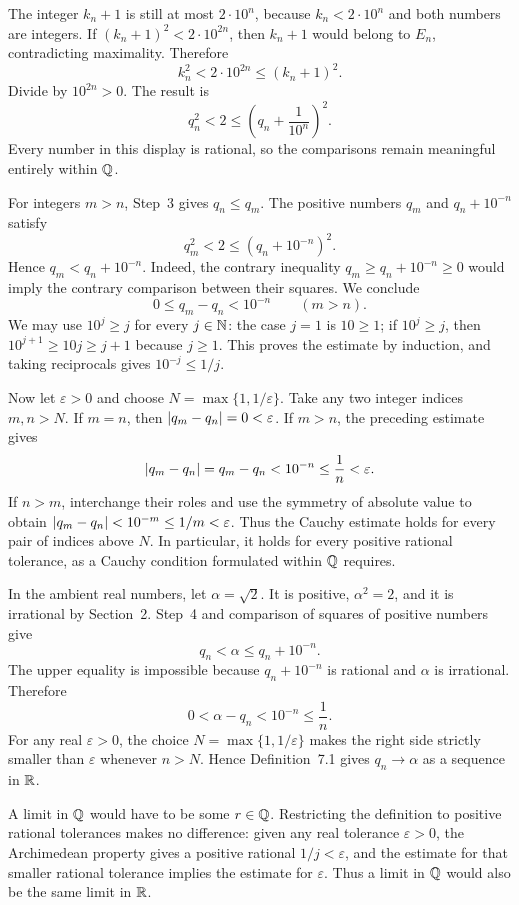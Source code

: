 The integer $k_n+1$ is still at most $2\cdot10^n$, because
$k_n<2\cdot10^n$ and both numbers are integers. If
$(k_n+1)^2<2\cdot10^{2n}$, then $k_n+1$ would belong to $E_n$,
contradicting maximality. Therefore
\[
 k_n^2<2\cdot10^{2n}\le(k_n+1)^2.
\]
Divide by $10^{2n}>0$. The result is
\[
 q_n^2<2\le\left(q_n+\frac1{10^n}\right)^2.
\]
Every number in this display is rational, so the comparisons remain
meaningful entirely within $\mathbb{Q}$.

For integers $m>n$, Step~3 gives $q_n\le q_m$.
The positive numbers $q_m$ and $q_n+10^{-n}$ satisfy
\[
 q_m^2<2\le(q_n+10^{-n})^2.
\]
Hence $q_m<q_n+10^{-n}$. Indeed, the contrary inequality
$q_m\ge q_n+10^{-n}\ge0$ would imply the contrary comparison
between their squares. We conclude
\[
 0\le q_m-q_n<10^{-n}\qquad(m>n).
\]
We may use $10^j\ge j$ for every $j\in\mathbb{N}$: the case $j=1$ is
$10\ge1$; if $10^j\ge j$, then
$10^{j+1}\ge10j\ge j+1$ because $j\ge1$. This proves the estimate
by induction, and taking reciprocals gives $10^{-j}\le1/j$.

Now let $\varepsilon>0$ and choose
$N=\max\{1,1/\varepsilon\}$. Take any two integer indices $m,n>N$.
If $m=n$, then $\left|q_m-q_n\right|=0<\varepsilon$.
If $m>n$, the preceding estimate gives
\[
 \left|q_m-q_n\right|=q_m-q_n<10^{-n}\le\frac1n<\varepsilon.
\]
If $n>m$, interchange their roles and use the symmetry of absolute
value to obtain
$\left|q_m-q_n\right|<10^{-m}\le1/m<\varepsilon$.
Thus the Cauchy estimate holds for every pair of indices above $N$.
In particular, it holds for every positive rational tolerance, as a
Cauchy condition formulated within $\mathbb{Q}$ requires.

In the ambient real numbers, let $\alpha=\sqrt2$. It is positive,
$\alpha^2=2$, and it is irrational by Section~2.
Step~4 and comparison of squares of positive numbers give
\[
 q_n<\alpha\le q_n+10^{-n}.
\]
The upper equality is impossible because $q_n+10^{-n}$ is rational
and $\alpha$ is irrational. Therefore
\[
 0<\alpha-q_n<10^{-n}\le\frac1n.
\]
For any real $\varepsilon>0$, the choice
$N=\max\{1,1/\varepsilon\}$ makes the right side strictly smaller
than $\varepsilon$ whenever $n>N$. Hence Definition~7.1 gives
$q_n\to\alpha$ as a sequence in $\mathbb{R}$.

A limit in $\mathbb{Q}$ would have to be some $r\in\mathbb{Q}$.
Restricting the definition to positive rational tolerances makes no
difference: given any real tolerance $\varepsilon>0$, the
Archimedean property gives a positive rational $1/j<\varepsilon$,
and the estimate for that smaller rational tolerance implies the
estimate for $\varepsilon$. Thus a limit in $\mathbb{Q}$ would also be the
same limit in $\mathbb{R}$.

